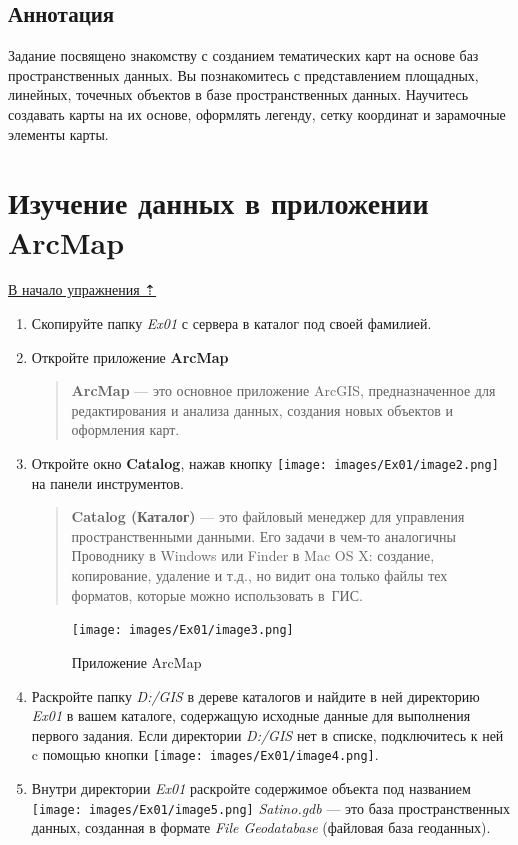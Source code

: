 \documentclass[12pt,]{book}
\begin{document}
\hypertarget{map-design-quaternary-annotation}{%
\subsection{Аннотация}\label{map-design-quaternary-annotation}}

Задание посвящено знакомству с созданием тематических карт на основе баз пространственных данных. Вы познакомитесь с представлением площадных, линейных, точечных объектов в базе пространственных данных. Научитесь создавать карты на их основе, оформлять легенду, сетку координат и зарамочные элементы карты.

\hypertarget{map-design-quaternary-data}{%
\section{Изучение данных в приложении ArcMap}\label{map-design-quaternary-data}}

\protect\hyperlink{map-design-quaternary}{В начало упражнения ⇡}

\begin{enumerate}
\def\labelenumi{\arabic{enumi}.}
\item
  Скопируйте папку \emph{Ex01} с сервера в каталог под своей фамилией.
\item
  Откройте приложение \textbf{ArcMap}

  \begin{quote}
  \textbf{ArcMap} --- это основное приложение ArcGIS, предназначенное для редактирования и анализа данных, создания новых объектов и оформления карт.
  \end{quote}
\item
  Откройте окно \textbf{Catalog}, нажав кнопку \texttt{[image: images/Ex01/image2.png]} на панели инструментов.

  \begin{quote}
  \textbf{Catalog (Каталог)} --- это файловый менеджер для управления пространственными данными. Его задачи в чем-то аналогичны Проводнику в Windows или Finder в Mac OS X: создание, копирование, удаление и т.д., но видит она только файлы тех форматов, которые можно использовать в~ГИС.
  \end{quote}

  \begin{figure}
  \centering
  \texttt{[image: images/Ex01/image3.png]}
  \caption{Приложение ArcMap}
  \end{figure}
\item
  Раскройте папку \emph{D:/GIS} в дереве каталогов и найдите в ней директорию \emph{Ex01} в вашем каталоге, содержащую исходные данные для выполнения первого задания. Если директории \emph{D:/GIS} нет в списке, подключитесь к ней c помощью кнопки \texttt{[image: images/Ex01/image4.png]}.
\item
  Внутри директории \emph{Ex01} раскройте содержимое объекта под названием \texttt{[image: images/Ex01/image5.png]} \emph{Satino.gdb} --- это база пространственных данных, созданная в формате \emph{File Geodatabase} (файловая база геоданных).
\end{enumerate}
\end{document}
